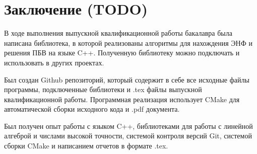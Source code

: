 \newpage

\section{Заключение (TODO)}

В ходе выполнения выпускной квалификационной работы бакалавра была написана библиотека, в которой реализованы алгоритмы для нахождения ЭНФ и решения ПБВ на языке C++. Полученную библиотеку можно подключать и использовать в других проектах.

Был создан Github репозиторий, который содержит в себе все исходные файлы программы, подключенные библиотеки и .tex файлы выпускной квалификационной работы. Программная реализация использует CMake для автоматической сборки исходного кода и .pdf документа.

Был получен опыт работы с языком C++, библиотеками для работы с линейной алгеброй и числами высокой точности, системой контроля версий Git, системой сборки CMake и написанием отчетов в формате .tex.

\clearpage